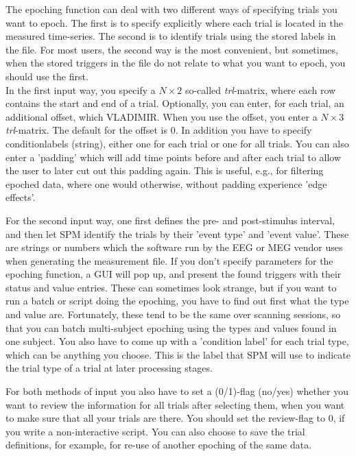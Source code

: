 The epoching function can deal with two different ways of specifying trials you want to epoch. The first is to specify explicitly where each trial is located in the measured time-series. The second is to identify trials using the stored labels in the file. For most users, the second way is the most convenient, but sometimes, when the stored triggers in the file do not relate to what you want to epoch, you should use the first. 
\\
In the first input way, you specify a $N \times 2$ so-called \textit{trl}-matrix, where each row contains the start and end of a trial. Optionally, you can enter, for each trial, an additional offset, which VLADIMIR. When you use the offset, you enter a $N \times 3$ \textit{trl}-matrix. The default for the offset is 0. In addition you have to specify conditionlabels (string), either one for each trial or one for all trials. You can also enter a 'padding' which will add time points before and after each trial to allow the user to later cut out this padding again. This is useful, e.g., for filtering epoched data, where one would otherwise, without padding experience 'edge effects'. 

For the second input way, one first defines the pre- and post-stimulus interval, and then let SPM identify the trials by their 'event type' and 'event value'. These are strings or numbers which the software run by the EEG or MEG vendor uses when generating the measurement file. If you don't specify parameters for the epoching function, a GUI will pop up, and present the found triggers with their status and value entries. These can sometimes look strange, but if you want to run a batch or script doing the epoching, you have to find out first what the type and value are. Fortunately, these tend to be the same over scanning sessions, so that you can batch multi-subject epoching using the types and values found in one subject. You also have to come up with a 'condition label' for each trial type, which can be anything you choose. This is the label that SPM will use to indicate the trial type of a trial at later processing stages.


For both methods of input you also have to set a (0/1)-flag (no/yes) whether you want to review the information for all trials after selecting them, when you want to make sure that all your trials are there. You should set the review-flag to 0, if you write a non-interactive script. You can also choose to save the trial definitions, for example, for re-use of another epoching of the same data.


